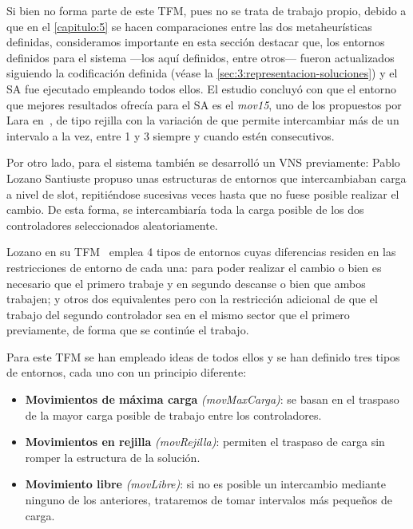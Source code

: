 Si bien no forma parte de este TFM, pues no se trata de trabajo propio, debido a que en el \autoref{capitulo:5} se hacen comparaciones entre las dos metaheurísticas definidas, consideramos importante en esta sección destacar que, los entornos definidos para el sistema \legacy{} ---los aquí definidos, entre otros--- fueron actualizados siguiendo la codificación definida (véase la \autoref{sec:3:representacion-soluciones})
y el SA fue ejecutado empleando todos ellos. El estudio concluyó con que el entorno que mejores resultados ofrecía para el SA es el \textit{mov15}, uno de los propuestos por Lara en~\cite{tesis-jonatan}, de tipo rejilla con la variación de que permite intercambiar más de un intervalo a la vez, entre 1 y 3 siempre y cuando estén consecutivos.

Por otro lado, para el sistema \legacy{} también se desarrolló un VNS previamente: Pablo Lozano Santiuste propuso unas estructuras de entornos que intercambiaban carga a nivel de slot, repitiéndose sucesivas veces hasta que no fuese posible realizar el cambio. De esta forma, se intercambiaría toda la carga posible de los dos controladores seleccionados aleatoriamente. 

Lozano en su TFM~\cite{tesis-pablo} emplea 4 tipos de entornos cuyas diferencias residen en las restricciones de entorno de cada una: para poder realizar el cambio o bien es necesario que el primero trabaje y en segundo descanse o bien que ambos trabajen; y otros dos equivalentes pero con la restricción adicional de que el trabajo del segundo controlador sea en el mismo sector que el primero previamente, de forma que se continúe el trabajo.


Para este TFM se han empleado ideas de todos ellos y se han definido tres tipos de entornos, cada uno con un principio diferente:
\begin{itemize}
    \item \textbf{Movimientos de máxima carga} \textit{(movMaxCarga)}: se basan en el traspaso de la mayor carga posible de trabajo entre los controladores.

    \item \textbf{Movimientos en rejilla} \textit{(movRejilla)}: permiten el traspaso de carga sin romper la estructura de la solución.

    \item \textbf{Movimiento libre} \textit{(movLibre)}: si no es posible un intercambio mediante ninguno de los anteriores, trataremos de tomar intervalos más pequeños de carga.
\end{itemize}

